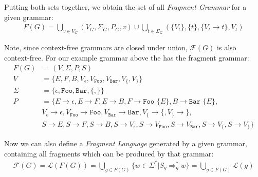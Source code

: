 \documentclass[runningheads,a4paper]{llncs}
\begin{document}
Putting both sets together, we obtain the set of all \textit{Fragment Grammar} for a given grammar:
\begin{align*}
F(G) = 
\bigcup\limits_{v \in V_G} (V_G,\Sigma_G,P_G,v)
\cup
\bigcup\limits_{t \in \Sigma_G} (\{V_t\},\{t\},\{V_t \rightarrow t\}, V_t)
\end{align*}

Note, since context-free grammars are closed under union, $\mathcal{F}(G)$ is also context-free.
For our example grammar above the has the fragment grammar:
\begin{align*}
F(G) &= (V,\Sigma,P,S)
\\V &= \{ E,F,B,V_{\epsilon},V_{\texttt{Foo}},V_{\texttt{Bar}},V_{\texttt{\{}},V_{\texttt{\}}} \}
\\\Sigma &= \{ \epsilon, \texttt{Foo}, \texttt{Bar}, \texttt{\{}, \texttt{\}} \}
\\P &= \{ 
E \rightarrow \epsilon
,E \rightarrow F
,E \rightarrow B
,F \rightarrow \texttt{Foo \{} E \texttt{\}}
,B \rightarrow \texttt{Bar \{} E \texttt{\}},
\\&
V_\epsilon \rightarrow \epsilon
,V_\texttt{Foo} \rightarrow \texttt{Foo}
,V_\texttt{Bar} \rightarrow \texttt{Bar}
,V_\texttt{\{} \rightarrow \texttt{\{}
,V_\texttt{\}} \rightarrow \texttt{\}},
\\&
S \rightarrow E
,S \rightarrow F
,S \rightarrow B
,S \rightarrow V_\epsilon
,S \rightarrow V_\texttt{Foo}
,S \rightarrow V_\texttt{Bar}
,S \rightarrow V_\texttt{\{}
,S \rightarrow V_\texttt{\}}
\}
\end{align*}

Now we can also define a \textit{Fragment Language} generated by a given grammar, containing all fragments which can be produced by that grammar:
\begin{align*}
\mathcal{F}(G) 
= \mathcal{L}(F(G))
= \bigcup\limits_{g \in F(G)} \{ w \in \Sigma^* | S_g \Rightarrow_{g}^* w \}
= \bigcup\limits_{g \in F(G)} \mathcal{L}(g)
\end{align*}
\end{document}
